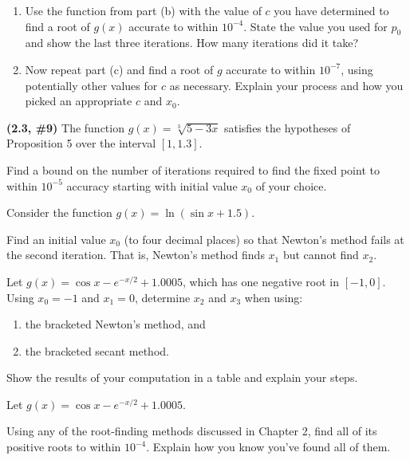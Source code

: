 \documentclass{eh-homework}
\begin{document}
\begin{question}{1}
\begin{enumerate}[label=\alph*.]
        \item Use the function from part (b) with the value of \(c\) you have determined to find a root of \(g(x)\) accurate to within \(10^{-4}\). State the value you used for \(p_0\) and show the last three iterations. How many iterations did it take?
    
        \item Now repeat part (c) and find a root of \(g\) accurate to within \(10^{-7}\), using potentially other values for \(c\) as necessary. Explain your process and how you picked an appropriate \(c\) and \(x_0\).
    \end{enumerate}
    \end{question}
    
    \begin{question}{2}
    \textbf{(2.3, \#9)} The function \(g(x) = \sqrt[3]{5 - 3x}\) satisfies the hypotheses of Proposition 5 over the interval \([1, 1.3]\).
    
    Find a bound on the number of iterations required to find the fixed point to within \(10^{-5}\) accuracy starting with initial value \(x_0\) of your choice.
    \end{question}
    
    \begin{question}{3}
    Consider the function \(g(x) = \ln(\sin x + 1.5)\).
    
    Find an initial value \(x_0\) (to four decimal places) so that Newton’s method fails at the second iteration. That is, Newton’s method finds \(x_1\) but cannot find \(x_2\).
    \end{question}
    
    \begin{question}{4}
    Let \(g(x) = \cos x - e^{-x/2} + 1.0005\), which has one negative root in \([-1, 0]\). Using \(x_0 = -1\) and \(x_1 = 0\), determine \(x_2\) and \(x_3\) when using:
    
    \begin{enumerate}[label=\alph*.]
        \item the bracketed Newton’s method, and
        \item the bracketed secant method.
    \end{enumerate}
    
    Show the results of your computation in a table and explain your steps.
    \end{question}
    
    \begin{question}{5}
    Let \(g(x) = \cos x - e^{-x/2} + 1.0005\).
    
    Using any of the root-finding methods discussed in Chapter 2, find all of its positive roots to within \(10^{-4}\). Explain how you know you’ve found all of them.
    \end{question}
    
\end{document}
